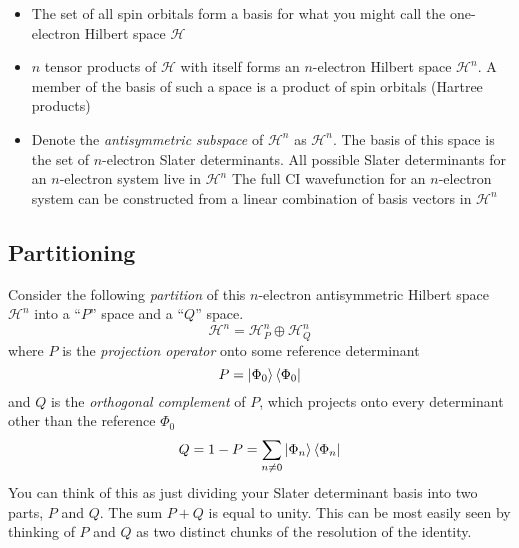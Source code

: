 \documentclass{article}
\begin{document}
\begin{itemize}
\item The set of all spin orbitals form a basis for what you might call the one-electron Hilbert space $\mathcal{H}$
\item $n$ tensor products of $\mathcal{H}$ with itself forms an $n$-electron Hilbert space $\mathcal{H}^n$. 
        A member of the basis of such a space is a product of spin orbitals (Hartree products)
\item Denote the \textit{antisymmetric subspace} of $\mathcal{H}^n$ as $\mathscr{H}^n$. The basis of this space
    is the set of $n$-electron Slater determinants. All possible Slater determinants for an $n$-electron system live in $\mathscr{H}^n$ 
    The full CI wavefunction for an $n$-electron system can be constructed from a linear combination of basis vectors in $\mathscr{H}^n$
\end{itemize}

\subsection{Partitioning}
Consider the following \textit{partition} of this $n$-electron antisymmetric Hilbert space $\mathscr{H}^n$ into
a ``$P$'' space and a ``$Q$'' space.
\[ \mathscr{H}^n = \mathscr{H}^n_P \oplus  \mathscr{H}^n_Q \]
where $P$ is the \textit{projection operator} onto some reference determinant 
\[P = \ket{\Phi_0}\bra{\Phi_0}  \]
and $Q$ is the \textit{orthogonal complement} of $P$, which projects onto every determinant other than the reference $\Phi_0$
\[Q = 1 - P = \sum_{n \neq 0}  \ket{\Phi_n}\bra{\Phi_n} \]
You can think of this as just dividing your Slater determinant basis into two parts, $P$ and $Q$.
The sum $P + Q$ is equal to unity. This can be most easily seen by thinking of $P$ and $Q$ as two distinct chunks of the resolution of the identity. 
\end{document}
